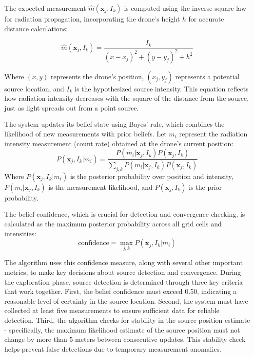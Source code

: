 \documentclass[../report.tex]{subfiles}
\begin{document}
    The expected measurement $\hat{m}(\mathbf{x}_j, I_k)$ is computed using the inverse square law for radiation propagation, incorporating the drone's height $h$ for accurate distance calculations:

    \begin{equation}
        \hat{m}(\mathbf{x}_j, I_k) = \frac{I_k}{(x - x_j)^2 + (y - y_j)^2 + h^2}
    \end{equation}

    Where $(x,y)$ represents the drone's position, $(x_j,y_j)$ represents a potential source location, and $I_k$ is the hypothesized source intensity. This equation reflects how 
    radiation intensity decreases with the square of the distance from the source, just as light spreads out from a point source.
    
    The system updates its belief state using Bayes' rule, which combines the likelihood of new measurements with prior beliefs. Let $m_i$ represent the radiation intensity measurement (count rate) 
    obtained at the drone's current position:
    \begin{equation}
        P(\mathbf{x}_j, I_k|m_i) = \frac{P(m_i|\mathbf{x}_j, I_k)P(\mathbf{x}_j, I_k)}{\sum_{j,k} P(m_i|\mathbf{x}_j, I_k)P(\mathbf{x}_j, I_k)}
    \end{equation}
    Where $P(\mathbf{x}_j, I_k|m_i)$ is the posterior probability over position and intensity, $P(m_i|\mathbf{x}_j,I_k)$ is the measurement likelihood, and $P(\mathbf{x}_j,I_k)$ is the prior probability.

    The belief confidence, which is crucial for detection and convergence checking, is calculated as the maximum posterior probability across all grid cells and intensities:
    \begin{equation}
        \text{confidence} = \max_{j,k} P(\mathbf{x}_j, I_k|m_i)
    \end{equation}

    The algorithm uses this confidence measure, along with several other important metrics, to make key decisions about source detection and convergence. During the exploration phase, source detection 
    is determined through three key criteria that work together. First, the belief confidence must exceed 0.50, indicating a reasonable level of certainty in the source location. Second, the system 
    must have collected at least five measurements to ensure sufficient data for reliable detection. Third, the algorithm checks for stability in the source position estimate - specifically, the 
    maximum likelihood estimate of the source position must not change by more than 5 meters between consecutive updates. This stability check helps prevent false detections due to temporary 
    measurement anomalies.
   
\end{document}
